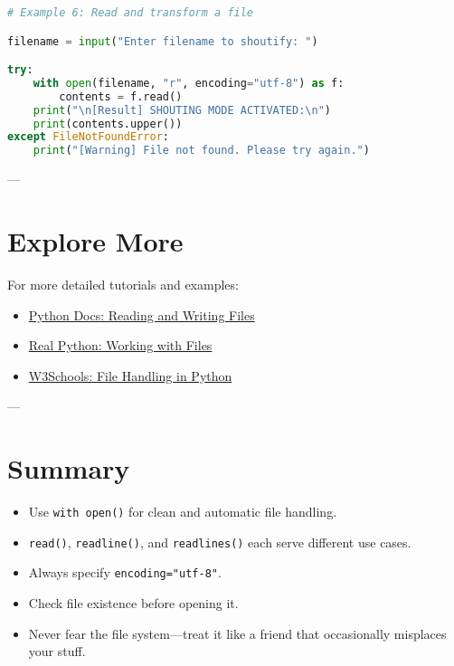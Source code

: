 \begin{lstlisting}[language=Python, caption={Challenge Activity: Transform file contents.}]
# Example 6: Read and transform a file

filename = input("Enter filename to shoutify: ")

try:
    with open(filename, "r", encoding="utf-8") as f:
        contents = f.read()
    print("\n[Result] SHOUTING MODE ACTIVATED:\n")
    print(contents.upper())
except FileNotFoundError:
    print("[Warning] File not found. Please try again.")
\end{lstlisting}

---

\section{Explore More}

For more detailed tutorials and examples:
\begin{itemize}
  \item \href{https://docs.python.org/3/tutorial/inputoutput.html#reading-and-writing-files}{Python Docs: Reading and Writing Files}
  \item \href{https://realpython.com/read-write-files-python/}{Real Python: Working with Files}
  \item \href{https://www.w3schools.com/python/python_file_handling.asp}{W3Schools: File Handling in Python}
\end{itemize}

---

\section*{Summary}
\begin{itemize}
  \item Use \texttt{with open()} for clean and automatic file handling.
  \item \texttt{read()}, \texttt{readline()}, and \texttt{readlines()} each serve different use cases.
  \item Always specify \texttt{encoding="utf-8"}.
  \item Check file existence before opening it.
  \item Never fear the file system—treat it like a friend that occasionally misplaces your stuff.
\end{itemize}
